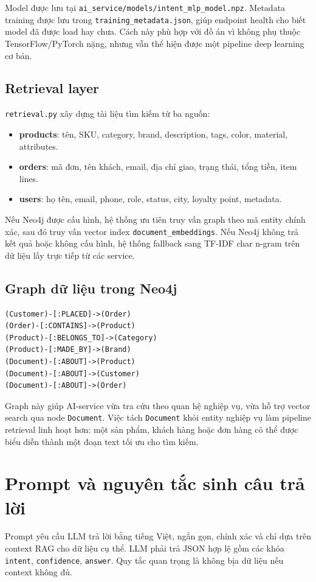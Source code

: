 \documentclass[12pt,a4paper]{report}
\begin{document}
Model được lưu tại \texttt{ai\_service/models/intent\_mlp\_model.npz}. Metadata training được lưu trong \texttt{training\_metadata.json}, giúp endpoint health cho biết model đã được load hay chưa. Cách này phù hợp với đồ án vì không phụ thuộc TensorFlow/PyTorch nặng, nhưng vẫn thể hiện được một pipeline deep learning cơ bản.

\subsection{Retrieval layer}
\texttt{retrieval.py} xây dựng tài liệu tìm kiếm từ ba nguồn:
\begin{itemize}
  \item \textbf{products}: tên, SKU, category, brand, description, tags, color, material, attributes.
  \item \textbf{orders}: mã đơn, tên khách, email, địa chỉ giao, trạng thái, tổng tiền, item lines.
  \item \textbf{users}: họ tên, email, phone, role, status, city, loyalty point, metadata.
\end{itemize}

Nếu Neo4j được cấu hình, hệ thống ưu tiên truy vấn graph theo mã entity chính xác, sau đó truy vấn vector index \texttt{document\_embeddings}. Nếu Neo4j không trả kết quả hoặc không cấu hình, hệ thống fallback sang TF-IDF char n-gram trên dữ liệu lấy trực tiếp từ các service.

\subsection{Graph dữ liệu trong Neo4j}
\begin{lstlisting}[style=code,caption={Graph knowledge base cho e-commerce}]
(Customer)-[:PLACED]->(Order)
(Order)-[:CONTAINS]->(Product)
(Product)-[:BELONGS_TO]->(Category)
(Product)-[:MADE_BY]->(Brand)
(Document)-[:ABOUT]->(Product)
(Document)-[:ABOUT]->(Customer)
(Document)-[:ABOUT]->(Order)
\end{lstlisting}

Graph này giúp AI-service vừa tra cứu theo quan hệ nghiệp vụ, vừa hỗ trợ vector search qua node \texttt{Document}. Việc tách \texttt{Document} khỏi entity nghiệp vụ làm pipeline retrieval linh hoạt hơn: một sản phẩm, khách hàng hoặc đơn hàng có thể được biểu diễn thành một đoạn text tối ưu cho tìm kiếm.

\section{Prompt và nguyên tắc sinh câu trả lời}
Prompt yêu cầu LLM trả lời bằng tiếng Việt, ngắn gọn, chính xác và chỉ dựa trên context RAG cho dữ liệu cụ thể. LLM phải trả JSON hợp lệ gồm các khóa \texttt{intent}, \texttt{confidence}, \texttt{answer}. Quy tắc quan trọng là không bịa dữ liệu nếu context không đủ.
\end{document}
